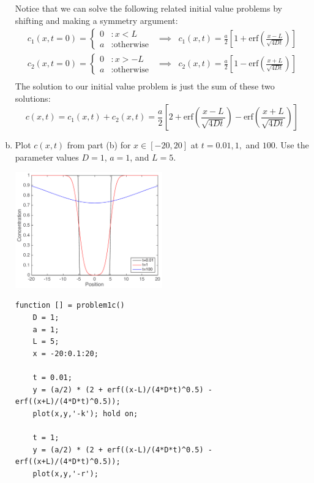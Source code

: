 \documentclass{article}
\begin{document}
\begin{enumerate}[a)]
{\color{red}
Notice that we can solve the following related initial value problems by shifting and making a symmetry argument:
\begin{eqnarray*}
c_1(x,t=0) = \left\{
     \begin{array}{lr}
       0 & : x < L\\
       a & : \textrm{otherwise}
     \end{array}
   \right. & \implies & c_1(x,t) = \frac{a}{2} \left[ 1 + \textrm{erf} \left( \frac{x- L}{\sqrt{4Dt}} \right) \right]\\
   c_2(x,t=0) = \left\{
     \begin{array}{lr}
       0 & : x > -L\\
       a & : \textrm{otherwise}
     \end{array}
   \right. & \implies & c_2(x,t) = \frac{a}{2} \left[ 1 - \textrm{erf} \left( \frac{x+L}{\sqrt{4Dt}} \right) \right]\\
   \end{eqnarray*}
The solution to our initial value problem is just the sum of these two solutions:
\[ c(x,t) = c_1(x,t) + c_2(x,t) = \frac{a}{2} \left[ 2 + \textrm{erf} \left( \frac{x-L}{\sqrt{4Dt}} \right)  - \textrm{erf} \left( \frac{x+L}{\sqrt{4Dt}} \right) \right] \]
}

\item Plot $c(x,t)$ from part (b) for $x\in[-20,20]$ at $t=0.01, 1,$ and $100$. Use the parameter values $D=1$, $a=1$, and $L=5$.
\begin{center}
\includegraphics[width=0.5\textwidth]{problem1c.pdf}
\end{center}

\begin{lstlisting}
function [] = problem1c()
    D = 1;
    a = 1;
    L = 5;
    x = -20:0.1:20;
    
    t = 0.01;
    y = (a/2) * (2 + erf((x-L)/(4*D*t)^0.5) - erf((x+L)/(4*D*t)^0.5));
    plot(x,y,'-k'); hold on;
    
    t = 1;
    y = (a/2) * (2 + erf((x-L)/(4*D*t)^0.5) - erf((x+L)/(4*D*t)^0.5));
    plot(x,y,'-r'); 
    

\end{lstlisting}
\end{enumerate}
\end{document}
